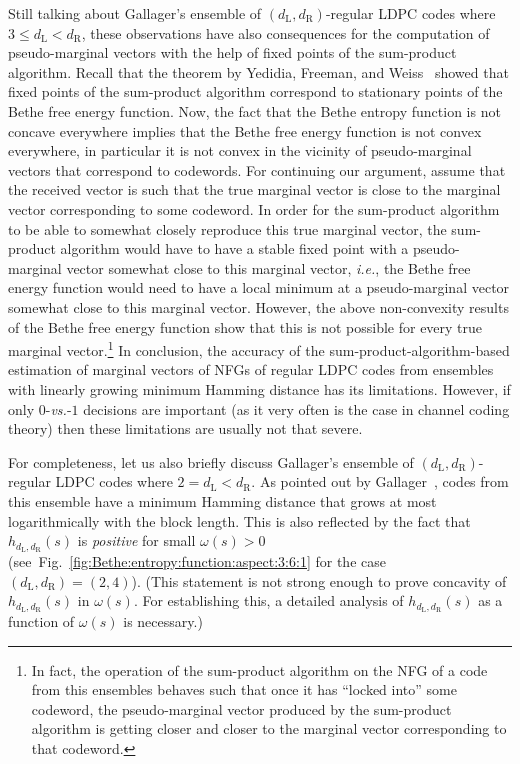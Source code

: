 \documentclass[journal, twocolumn]{IEEEtran}
\newcommand{\ie}{\emph{i.e.}}
\newcommand{\versus}{\emph{vs.}}
\renewcommand{\leq}{\leqslant}
\newcommand{\dleft}{d_{\mathrm{L}}}
\newcommand{\dright}{d_{\mathrm{R}}}
\newcommand{\?}{\mathrm{?}}
\begin{document}
Still talking about Gallager's ensemble of $(\dleft,\dright)$-regular LDPC
codes where $3 \leq \dleft < \dright$, these observations have also
consequences for the computation of pseudo-marginal vectors with the help of
fixed points of the sum-product algorithm. Recall that the theorem by Yedidia,
Freeman, and Weiss~\cite{Yedidia:Freeman:Weiss:05:1} showed that fixed points
of the sum-product algorithm correspond to stationary points of the Bethe free
energy function. Now, the fact that the Bethe entropy function is not concave
everywhere implies that the Bethe free energy function is not convex
everywhere, in particular it is not convex in the vicinity of pseudo-marginal
vectors that correspond to codewords. For continuing our argument, assume that
the received vector is such that the true marginal vector is close to the
marginal vector corresponding to some codeword. In order for the sum-product
algorithm to be able to somewhat closely reproduce this true marginal vector,
the sum-product algorithm would have to have a stable fixed point with a
pseudo-marginal vector somewhat close to this marginal vector, \ie, the Bethe
free energy function would need to have a local minimum at a pseudo-marginal
vector somewhat close to this marginal vector. However, the above
non-convexity results of the Bethe free energy function show that this is not
possible for every true marginal vector.\footnote{In fact, the operation of
  the sum-product algorithm on the NFG of a code from this ensembles behaves
  such that once it has ``locked into'' some codeword, the pseudo-marginal
  vector produced by the sum-product algorithm is getting closer and closer to
  the marginal vector corresponding to that codeword.} In conclusion, the
accuracy of the sum-product-algorithm-based estimation of marginal vectors of
NFGs of regular LDPC codes from ensembles with linearly growing minimum
Hamming distance has its limitations. However, if only $0$-\versus-$1$
decisions are important (as it very often is the case in channel coding
theory) then these limitations are usually not that severe.

For completeness, let us also briefly discuss Gallager's ensemble of
$(\dleft,\dright)$-regular LDPC codes where $2 = \dleft < \dright$. As pointed
out by Gallager~\cite{Gallager:63}, codes from this ensemble have a minimum
Hamming distance that grows at most logarithmically with the block
length. This is also reflected by the fact that $h_{\dleft,\dright}(s)$ is
\emph{positive} for small $\omega(s) > 0$
(see~Fig.~\ref{fig:Bethe:entropy:function:aspect:3:6:1} for the case
$(\dleft,\dright) = (2,4)$). (This statement is not strong enough to prove
concavity of $h_{\dleft,\dright}(s)$ in $\omega(s)$. For establishing this, a
detailed analysis of $h_{\dleft,\dright}(s)$ as a function of $\omega(s)$ is
necessary.)
\end{document}
